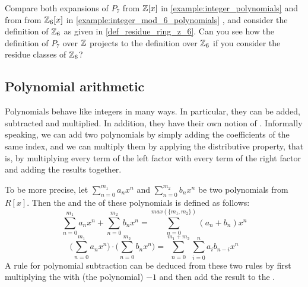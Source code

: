 \begin{exercise}
Compare both expansions of $P_7$ from $\mathbb{Z}[x]$ in \examplename{} \ref{example:integer_polynomials} and from  from $\mathbb{Z}_6[x]$ in \examplename{} \ref{example:integer_mod_6_polynomials} , and consider the definition of $\mathbb{Z}_6$ as given in \examplename{} \ref{def_residue_ring_z_6}. Can you see how the definition of $P_7$ over $\mathbb{Z}$ projects to the definition over $\mathbb{Z}_6$ if you consider the residue classes of $\mathbb{Z}_6$?
\end{exercise}
\subsection{Polynomial arithmetic}
Polynomials behave like integers in many ways. In particular, they can be added, subtracted and multiplied. In addition, they have their own notion of . Informally speaking, we can add two polynomials  by simply adding the coefficients of the same index, and we can multiply them by applying the distributive property, that is, by multiplying every term of the left factor with every term of the right factor and adding the results together.

To be more precise, let $ \sum _{n = 0} ^{m_1}{a} _{n}{x} ^{n} $ and
$ \sum _{n = 0} ^{m_2}{b} _{n}{x^n} $ be two polynomials from $ R[x]$. Then the  and the  of these polynomials is defined as follows:
\begin{equation}
\label{def:polynomial_arithmetic}
\sum _{n = 0} ^{m_1}{a} _{n}{x} ^{n} + \sum _{n = 0} ^{m_2}{b} _{n}{x } ^{n} = \sum _{n = 0} ^{max(\{m_1,m_2\})}{({a} _{n} +{b} _{n})}{x} ^{n}
\end{equation}
\begin{equation}
\label{def:polynomial_arithmetic_mul}
\bigg (\sum _{n = 0} ^{m_1}{a} _{n}{x} ^{n} \bigg) \cdot \bigg (\sum _{n = 0} ^{m_2 }{b} _{n}{x} ^{n} \bigg) = \sum _{n = 0} ^{m_1+m_2} \sum _{i = 0} ^{n}{a} _{i }{{b} _{n-i}}{x} ^{n}
\end{equation}
A rule for polynomial subtraction can be deduced from these two rules by first multiplying the  with (the polynomial) $-1$ and then add the result to the .

